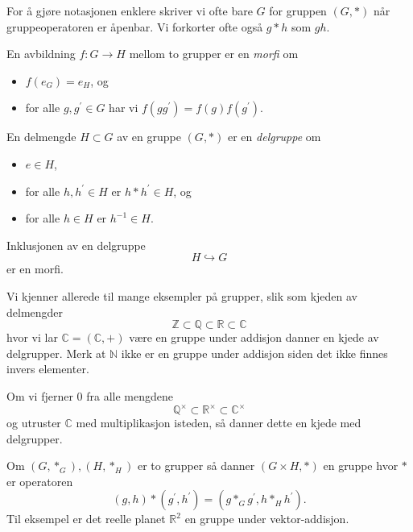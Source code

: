 For å gjøre notasjonen enklere skriver vi ofte bare $G$ for gruppen $(G,\ast)$
når gruppeoperatoren er åpenbar.
Vi forkorter ofte også $g\ast h$ som $gh$.

\begin{definition}
    En avbildning $f\colon G\to H$ mellom to grupper
    er en \textit{morfi} om
    \begin{itemize}
        \item $f(e_G) = e_H$, og
        \item for alle $g, g^\prime\in G$ har vi $f(gg^\prime) = f(g)f(g^\prime)$.
    \end{itemize}
\end{definition}

\begin{definition}
    En delmengde $H\subset G$ av en gruppe $(G, \ast)$ er en \textit{delgruppe}
    om
    \begin{itemize}
        \item $e\in H$,
        \item for alle $h, h^\prime \in H$ er $h\ast h^\prime\in H$,
            og
        \item for alle $h\in H$ er $h^{-1}\in H$.
    \end{itemize}
\end{definition}

\begin{remark}
    Inklusjonen av en delgruppe
    \[
        H\hookrightarrow G
    \]
    er en morfi.
\end{remark}

\begin{example}
    Vi kjenner allerede til mange eksempler på grupper,
    slik som kjeden av delmengder
    \[
        \mathbb Z
        \subset \mathbb Q
        \subset \mathbb R
        \subset \mathbb C
    \]
    hvor vi lar $\mathbb C = (\mathbb C, +)$ være en gruppe under addisjon
    danner en kjede av delgrupper.
    Merk at $\mathbb N$ ikke er en gruppe under addisjon siden det ikke finnes
    invers elementer.

    Om vi fjerner $0$ fra alle mengdene
    \[
        \mathbb Q^\times
        \subset \mathbb R^\times
        \subset \mathbb C^\times
    \]
    og utruster $\mathbb C$ med multiplikasjon isteden,
    så danner dette en kjede med delgrupper.
\end{example}

\begin{example}
    Om $(G, \ast_G), (H, \ast_H)$ er to grupper så danner $(G\times H, \ast)$
    en gruppe hvor $\ast$ er operatoren
    \[
        (g, h)\ast (g^\prime, h^\prime)
        = (g \ast_G g^\prime, h\ast_H h^\prime).
    \]
    Til eksempel er det reelle planet $\mathbb R^2$ en gruppe under vektor-addisjon.
\end{example}

